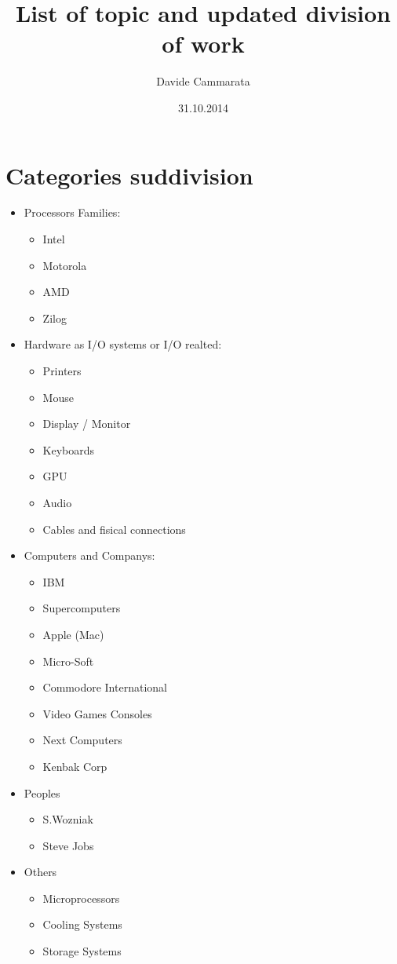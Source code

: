 \documentclass[]{article}
\begin{document}
\title{List of topic and updated division of work}
\author{Davide Cammarata}
\date{31.10.2014}
\maketitle

\section*{Categories suddivision}

\begin{itemize}
\item Processors Families:
\begin{itemize}
\item Intel
\item Motorola
 \item AMD
\item Zilog
\end{itemize}
\item Hardware as I/O systems or I/O realted:
\begin{itemize}
\item Printers
\item Mouse
\item Display / Monitor 
\item Keyboards
\item GPU  
\item Audio
\item Cables and fisical connections
\end{itemize}
\item Computers and Companys: 
\begin{itemize}
\item IBM 
\item Supercomputers
\item Apple (Mac)
\item Micro-Soft
\item Commodore International
\item Video Games Consoles
\item Next Computers
\item Kenbak Corp
\end{itemize}
\item Peoples
\begin{itemize}
\item S.Wozniak  
\item Steve Jobs
\end{itemize} 
\item Others
\begin{itemize}
\item Microprocessors
\item Cooling Systems
\item Storage Systems
\end{itemize}
\end{itemize}
\end{document}
